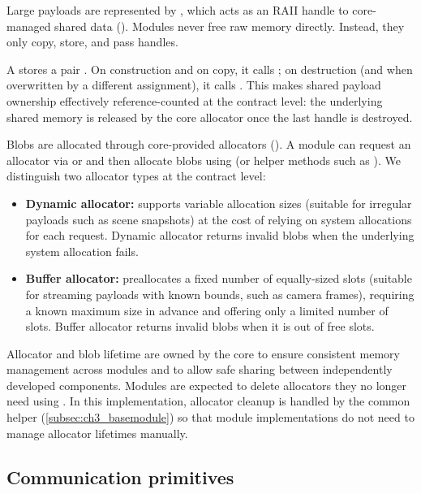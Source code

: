 Large payloads are represented by , which acts as an RAII handle to core-managed shared data (). Modules never free raw memory directly. Instead, they only copy, store, and pass  handles.

A  stores a pair . On construction and on copy, it calls ; on destruction (and when overwritten by a different assignment), it calls .
This makes shared payload ownership effectively reference-counted at the contract level: the underlying shared memory is released by the core allocator once the last  handle is destroyed.

Blobs are allocated through core-provided allocators (). A module can request an allocator via  or  and then allocate blobs using  (or helper methods such as ). We distinguish two allocator types at the contract level:
\begin{itemize}
    \item \textbf{Dynamic allocator:} supports variable allocation sizes (suitable for irregular payloads such as scene snapshots) at the cost of relying on system allocations for each request. Dynamic allocator returns invalid blobs when the underlying system allocation fails.
    \item \textbf{Buffer allocator:} preallocates a fixed number of equally-sized slots (suitable for streaming payloads with known bounds, such as camera frames), requiring a known maximum size in advance and offering only a limited number of slots. Buffer allocator returns invalid blobs when it is out of free slots.
\end{itemize}

Allocator and blob lifetime are owned by the core to ensure consistent memory management across modules and to allow safe sharing between independently developed components. Modules are expected to delete allocators they no longer need using . In this implementation, allocator cleanup is handled by the common  helper (\autoref{subsec:ch3_basemodule}) so that module implementations do not need to manage allocator lifetimes manually.


\subsection{Communication primitives} \label{subsec:ch3_comm_primitives}


